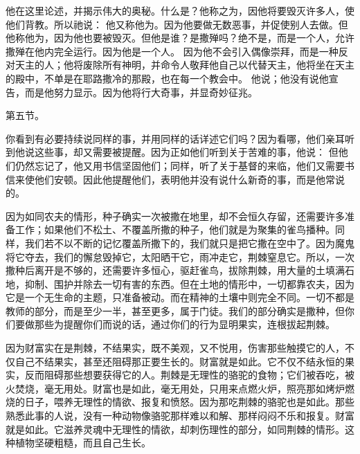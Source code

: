 他在这里论述，并揭示伟大的奥秘。什么是？他称之为，因他将要毁灭许多人，使他们背教。所以祂说： 他又称他为。因为他要做无数恶事，并促使别人去做。但他称他为，因为他也要被毁灭。但他是谁？是撒殚吗？绝不是，而是一个人，允许撒殚在他内完全运行。因为他是一个人。 因为他不会引入偶像崇拜，而是一种反对天主的人；他将废除所有神明，并命令人敬拜他自己以代替天主，他将坐在天主的殿中，不单是在耶路撒冷的那殿，也在每一个教会中。 他说；他没有说他宣告，而是他努力显示。因为他将行大奇事，并显奇妙征兆。\par

第五节。\par

你看到有必要持续说同样的事，并用同样的话详述它们吗？因为看哪，他们亲耳听到他说这些事，却又需要被提醒。因为正如他们听到关于苦难的事，他说： 但他们仍然忘记了，他又用书信坚固他们；同样，听了关于基督的来临，他们又需要书信来使他们安顿。因此他提醒他们，表明他并没有说什么新奇的事，而是他常说的。\par

因为如同农夫的情形，种子确实一次被撒在地里，却不会恒久存留，还需要许多准备工作；如果他们不松土、不覆盖所撒的种子，他们就是为聚集的雀鸟播种。同样，我们若不以不断的记忆覆盖所撒下的，我们就只是把它撒在空中了。因为魔鬼将它夺去，我们的懈怠毁掉它，太阳晒干它，雨冲走它，荆棘窒息它。所以，一次撒种后离开是不够的，还需要许多恒心，驱赶雀鸟，拔除荆棘，用大量的土填满石地，抑制、围护并除去一切有害的东西。但在土地的情形中，一切都靠农夫，因为它是一个无生命的主题，只准备被动。而在精神的土壤中则完全不同。一切不都是教师的部分，而是至少一半，甚至更多，属于门徒。我们的部分确实是撒种，但你们要做那些为提醒你们而说的话，通过你们的行为显明果实，连根拔起荆棘。\par

因为财富实在是荆棘，不结果实，既不美观，又不悦用，伤害那些触摸它的人，不仅自己不结果实，甚至还阻碍那正要生长的。财富就是如此。它不仅不结永恒的果实，反而阻碍那些想要获得它的人。荆棘是无理性的骆驼的食物；它们被吞吃，被火焚烧，毫无用处。财富也是如此，毫无用处，只用来点燃火炉，照亮那如烤炉燃烧的日子，喂养无理性的情欲、报复和愤怒。因为那吃荆棘的骆驼也是如此。那些熟悉此事的人说，没有一种动物像骆驼那样难以和解、那样闷闷不乐和报复。财富就是如此。它滋养灵魂中无理性的情欲，却刺伤理性的部分，如同荆棘的情形。这种植物坚硬粗糙，而且自己生长。\par

